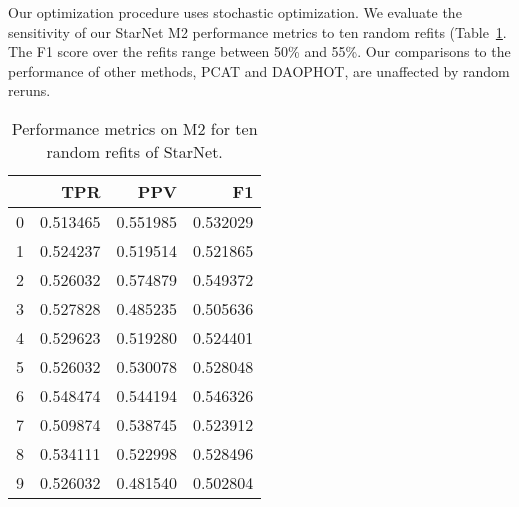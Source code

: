 
Our optimization procedure uses stochastic optimization. 
We evaluate the sensitivity of our StarNet M2 performance metrics to ten random refits (Table~\ref{tab:refits}. 
The F1 score over the refits range
between 50\% and 55\%. Our comparisons 
to the performance of other methods, PCAT and DAOPHOT, 
are unaffected by random reruns. 

\begin{table}
\centering
\caption{Performance metrics on M2 for ten random refits of StarNet. }
\label{tab:refits}
\begin{tabular}{lrrr}
\toprule
 &       TPR &       PPV &        F1 \\
\midrule
0 &  0.513465 &  0.551985 &  0.532029 \\
1 &  0.524237 &  0.519514 &  0.521865 \\
2 &  0.526032 &  0.574879 &  0.549372 \\
3 &  0.527828 &  0.485235 &  0.505636 \\
4 &  0.529623 &  0.519280 &  0.524401 \\
5 &  0.526032 &  0.530078 &  0.528048 \\
6 &  0.548474 &  0.544194 &  0.546326 \\
 7 &  0.509874 &  0.538745 &  0.523912 \\
8 &  0.534111 &  0.522998 &  0.528496 \\
9 &  0.526032 &  0.481540 &  0.502804 \\
\bottomrule
\end{tabular}
\end{table}
